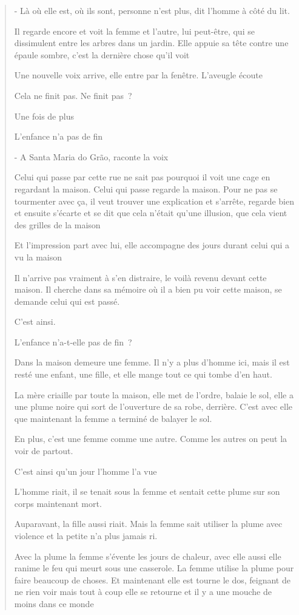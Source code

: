 \begin{quote}
- Là où elle est, où ils sont, personne n'est plus, dit l'homme à côté
du lit.

Il regarde encore et voit la femme et l'autre, lui peut-être, qui se
dissimulent entre les arbres dans un jardin. Elle appuie sa tête contre
une épaule sombre, c'est la dernière chose qu'il voit

Une nouvelle voix arrive, elle entre par la fenêtre. L'aveugle écoute

Cela ne finit pas. Ne finit pas~?

Une fois de plus

L'enfance n'a pas de fin

- A Santa Maria do Grão, raconte la voix

Celui qui passe par cette rue ne sait pas pourquoi il voit une cage en
regardant la maison. Celui qui passe regarde la maison. Pour ne pas se
tourmenter avec ça, il veut trouver une explication et s'arrête, regarde
bien et ensuite s'écarte et se dit que cela n'était qu'une illusion, que
cela vient des grilles de la maison

Et l'impression part avec lui, elle accompagne des jours durant celui
qui a vu la maison

Il n'arrive pas vraiment à s'en distraire, le voilà revenu devant cette
maison. Il cherche dans sa mémoire où il a bien pu voir cette maison, se
demande celui qui est passé.

C'est ainsi.

L'enfance n'a-t-elle pas de fin~?

Dans la maison demeure une femme. Il n'y a plus d'homme ici, mais il est
resté une enfant, une fille, et elle mange tout ce qui tombe d'en haut.

La mère criaille par toute la maison, elle met de l'ordre, balaie le
sol, elle a une plume noire qui sort de l'ouverture de sa robe,
derrière. C'est avec elle que maintenant la femme a terminé de balayer
le sol.

En plus, c'est une femme comme une autre. Comme les autres on peut la
voir de partout.

C'est ainsi qu'un jour l'homme l'a vue

L'homme riait, il se tenait sous la femme et sentait cette plume sur son
corps maintenant mort.

Auparavant, la fille aussi riait. Mais la femme sait utiliser la plume
avec violence et la petite n'a plus jamais ri.

Avec la plume la femme s'évente les jours de chaleur, avec elle aussi
elle ranime le feu qui meurt sous une casserole. La femme utilise la
plume pour faire beaucoup de choses. Et maintenant elle est tourne le
dos, feignant de ne rien voir mais tout à coup elle se retourne et il y
a une mouche de moins dans ce monde


\end{quote}
